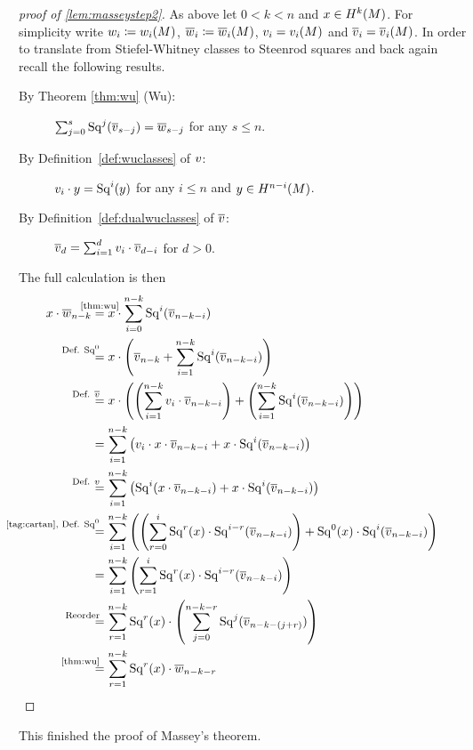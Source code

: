 \begin{proof}[proof of \autoref{lem:masseystep2}]
  As above let $0<k<n$ and $x\in H^k(M)$.
  For simplicity write
  $w_{i}\coloneqq{w_{i}}(M)$, $\overline{w}_{i}\coloneqq{\overline{w}_{i}}(M)$,
  $v_{i} = {v_{i}}(M)$ and $\overline{v}_{i} = {\overline{v}_{i}}(M)$.
  In order to translate from Stiefel-Whitney classes to Steenrod
  squares and back again recall the following results.
  \begin{description}
  \item[By Theorem \autoref{thm:wu} (Wu):]
    $\sum_{j=0}^{s} \mathrm{Sq}^{j}(\overline{v}_{s-j}) = \overline{w}_{s-j}$
    for any $s\leq n$.
  \item[By Definition~\autoref{def:wuclasses} of $v$:]
    $v_{i} \cdot y = \mathrm{Sq}^{i}(y)$
    for any $i\leq n$ and $y\in H^{n-i}(M)$.
  \item[By Definition~\autoref{def:dualwuclasses} of $\overline{v}$:]
    $\overline{v}_{d} = \sum_{i=1}^{d} v_{i}\cdot \overline{v}_{d-i}$ for $d>0$.
  \end{description}
  The full calculation is then
  \begin{align*}
    x\cdot \dualws{n-k}
    &\cequalsby{\autoref{thm:wu}}
      x\cdot \sum_{i=0}^{n-k} \Sq i(\dualvu{n-k-i}) \\
    &\equalsby{Def. $\Sq 0$}
      x\cdot\left(
      \dualvu{n-k} + \sum_{i=1}^{n-k} \Sq i(\dualvu{n-k-i})
      \right) \\
    &\equalsby{Def. $\dualVu$}
      x\cdot\left(
      \left(\sum_{i=1}^{n-k} \vu{i}\cdot\dualvu{n-k-i}\right)
      + \left(\sum_{i=1}^{n-k} \Sq i(\dualvu{n-k-i})\right)
      \right) \\
    &=
      \sum_{i=1}^{n-k} \left(
      \vu{i}\cdot x\cdot \dualvu{n-k-i}
      + x\cdot \Sq i(\dualvu{n-k-i})
      \right) \\
    &\equalsby{Def. $\Vu$}
      \sum_{i=1}^{n-k} \left(
      \Sq i (x\cdot \dualvu{n-k-i})
      + x\cdot \Sq i(\dualvu{n-k-i})
      \right) \\
    &\equalsby{\ref{tag:cartan}, Def. $\Sq 0$}
      \sum_{i=1}^{n-k} \left(
      \left( \sum_{r=0}^{i} \Sq r(x)\cdot \Sq{i-r}(\dualvu{n-k-i}) \right)
      + \Sq 0(x)\cdot \Sq i(\dualvu{n-k-i})
      \right) \\
    &=
      \sum_{i=1}^{n-k} \left(
      \sum_{r=1}^{i} \Sq r(x)\cdot \Sq{i-r}(\dualvu{n-k-i})
      \right) \\
    &\equalsby{Reorder}
      \sum_{r=1}^{n-k} \Sq r(x) \cdot
      \left( \sum_{j=0}^{n-k-r} \Sq j(\dualvu{n-k-(j+r)}) \right) \\
    &\equalsby{\autoref{thm:wu}}
      \sum_{r=1}^{n-k} \Sq r(x) \cdot\dualws{n-k-r}
      \qedhere
  \end{align*}
\end{proof}
This finished the proof of Massey's theorem.


